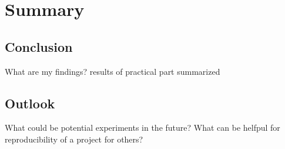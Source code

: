 \chapter{Summary}

\section{Conclusion}


What are my findings? results of practical part summarized

\section{Outlook}

What could be potential experiments in the future?
What can be helfpul for reproducibility of a project for others?

